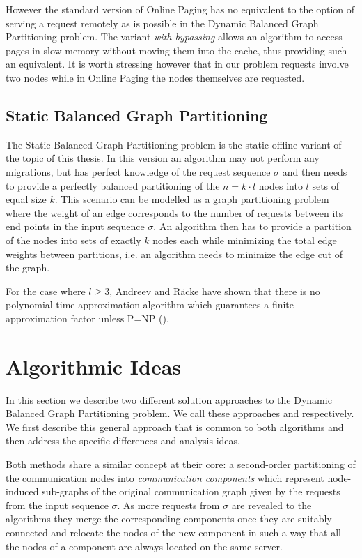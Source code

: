 \documentclass[a4paper,xcolor=dvipsnames, tikz, 12pt]{article}
\newcommand{\coreDel}{\text{C{\scriptsize ORE}-D{\scriptsize EL}}}
\newcommand{\adjDel}{\text{A{\scriptsize DJ}-D{\scriptsize EL}}}
\theoremstyle{definition}
\begin{document}
	However the standard version of Online Paging has no equivalent to the option of serving a request remotely as is possible in the Dynamic Balanced Graph Partitioning problem. The variant \textit{with bypassing} allows an algorithm to access pages in slow memory without moving them into the cache, thus providing such an equivalent. It is worth stressing however that in our problem requests involve two nodes while in Online Paging the nodes themselves are requested.
	
	
	\subsection{Static Balanced Graph Partitioning}
	The Static Balanced Graph Partitioning problem is the static offline variant of the topic of this thesis. In this version an algorithm may not perform any migrations, but has perfect knowledge of the request sequence $\sigma$ and then needs to provide a perfectly balanced partitioning of the $n=k\cdot l$ nodes into $l$ sets of equal size $k$. This scenario can be modelled as a graph partitioning problem where the weight of an edge corresponds to the number of requests between its end points in the input sequence $\sigma$. An algorithm then has to provide a partition of the nodes into sets of exactly $k$ nodes each while minimizing the total edge weights between partitions, i.e. an algorithm needs to minimize the edge cut of the graph. 
	
	For the case where $l\geq 3$, Andreev and R\"acke have shown that there is no polynomial time approximation algorithm which guarantees a finite approximation factor unless P=NP (\cite{Andreev2006}).
	
	
	\section{Algorithmic Ideas}
	\label{algIdeas}
	In this section we describe two different solution approaches to the Dynamic Balanced Graph Partitioning problem. We call these approaches \coreDel{} and \adjDel{} respectively. We first describe this general approach that is common to both algorithms and then address the specific differences and analysis ideas.
	
	Both methods share a similar concept at their core: a second-order partitioning of the communication nodes into \textit{communication components} which represent node-induced sub-graphs of the original communication graph given by the requests from the input sequence $\sigma$. As more requests from $\sigma$ are revealed to the algorithms they merge the corresponding components once they are suitably connected and relocate the nodes of the new component in such a way that all the nodes of a component are always located on the same server.
	
\end{document}
